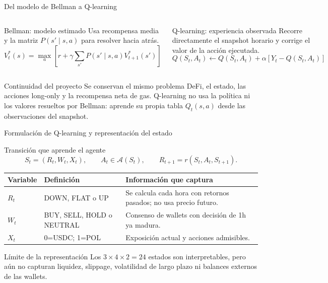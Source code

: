\documentclass[10pt,aspectratio=169]{beamer}
\begin{document}
\begin{frame}{Del modelo de Bellman a Q-learning}
\begin{columns}[T,onlytextwidth]
\begin{block}{Bellman: modelo estimado}
\centering
\small Usa recompensa media y la matriz $P(s'\mid s,a)$ para resolver hacia atrás.
\[
V_t^*(s)=\max_a\left[r+\gamma\sum_{s'}P(s'\mid s,a)V_{t+1}^*(s')\right]
\]
\end{block}
\begin{block}{Q-learning: experiencia observada}
\centering
\small Recorre directamente el snapshot horario y corrige el valor de la acción ejecutada.
\[
Q(S_t,A_t)\leftarrow Q(S_t,A_t)+\alpha[Y_t-Q(S_t,A_t)]
\]
\end{block}
\end{columns}
\vspace{.6em}
\begin{alertblock}{Continuidad del proyecto}
Se conservan el mismo problema DeFi, el estado, las acciones long-only y la recompensa neta de gas. Q-learning no usa la política ni los valores resueltos por Bellman: aprende su propia tabla $Q_t(s,a)$ desde las observaciones del snapshot.
\end{alertblock}
\end{frame}

\begin{frame}{Formulación de Q-learning y representación del estado}
\begin{block}{Transición que aprende el agente}
\centering
\[
S_t=(R_t,W_t,X_t),\qquad A_t\in\mathcal{A}(S_t),\qquad
R_{t+1}=r(S_t,A_t,S_{t+1}).
\]
\end{block}
\small
\begin{tabular}{p{.16\linewidth}p{.31\linewidth}p{.43\linewidth}}
\toprule
Variable & Definición & Información que captura \\
\midrule
$R_t$ & DOWN, FLAT o UP & Se calcula cada hora con retornos pasados; no usa precio futuro. \\
$W_t$ & BUY, SELL, HOLD o NEUTRAL & Consenso de wallets con decisión de 1h ya madura. \\
$X_t$ & 0=USDC; 1=POL & Exposición actual y acciones admisibles. \\
\bottomrule
\end{tabular}
\vspace{.55em}
\begin{alertblock}{Límite de la representación}
Los $3\times4\times2=24$ estados son interpretables, pero aún no capturan liquidez, slippage, volatilidad de largo plazo ni balances externos de las wallets.
\end{alertblock}
\end{frame}
\end{document}

